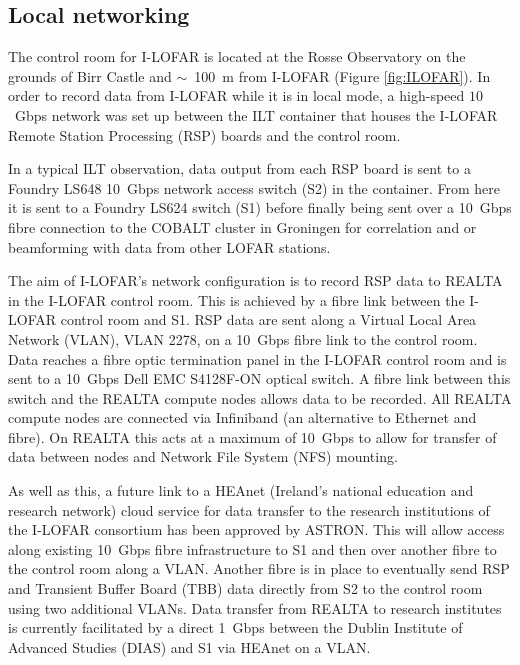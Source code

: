 \subsection{Local networking}
\label{sec:network}
The control room for I-LOFAR is located at the Rosse Observatory on the grounds of Birr Castle and $\sim$~100~m from I-LOFAR (Figure \ref{fig:ILOFAR}). In order to record data from I-LOFAR while it is in local mode, a high-speed $10$~Gbps network was set up between the ILT container that houses the I-LOFAR Remote Station Processing (RSP) boards and the control room.

In a typical ILT observation, data output from each RSP board is sent to a Foundry LS648 10~Gbps network access switch (S2) in the container. From here it is sent to a Foundry LS624 switch (S1) before finally being sent over a 10~Gbps fibre connection to the COBALT cluster in Groningen for correlation and or beamforming with data from other LOFAR stations.

The aim of I-LOFAR's network configuration is to record RSP data to REALTA in the I-LOFAR control room. This is achieved by a fibre link between the I-LOFAR control room and S1. RSP data are sent along a Virtual Local Area Network (VLAN), VLAN 2278, on a 10~Gbps fibre link to the control room. Data reaches a fibre optic termination panel in the I-LOFAR control room and is sent to a 10~Gbps Dell EMC S4128F-ON optical switch. A fibre link between this switch and the REALTA compute nodes allows data to be recorded. All REALTA compute nodes are connected via Infiniband (an alternative to Ethernet and fibre). On REALTA this acts at a maximum of 10~Gbps to allow for transfer of data between nodes and Network File System (NFS) mounting.

As well as this, a future link to a HEAnet (Ireland’s national education and research network) cloud service for data transfer to the research institutions of the I-LOFAR consortium has been approved by ASTRON. This will allow access along existing 10~Gbps fibre infrastructure to S1 and then over another fibre to the control room along a VLAN. Another fibre is in place to eventually send RSP and Transient Buffer Board (TBB) data directly from S2 to the control room using two additional VLANs.
Data transfer from REALTA to research institutes is currently facilitated by a direct 1~Gbps between the Dublin Institute of Advanced Studies (DIAS) and S1 via HEAnet on a VLAN.


